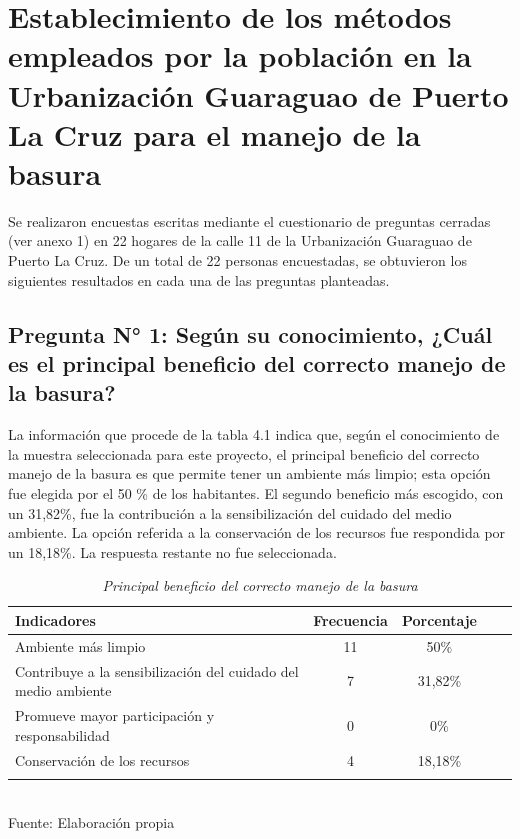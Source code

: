 \newpage

{\setlength{\parskip}{0cm}
\section{Establecimiento de los métodos empleados por la población en la Urbanización Guaraguao de Puerto La Cruz para el manejo de la basura}

Se realizaron encuestas escritas mediante el cuestionario de preguntas cerradas (ver anexo 1) en 22 hogares de la calle 11 de la Urbanización Guaraguao de Puerto La Cruz. De un total de 22 personas encuestadas, se obtuvieron los siguientes resultados en cada una de las preguntas planteadas.
}

{\setlength{\parskip}{0cm}
\subsection{Pregunta N° 1: Según su conocimiento, ¿Cuál es el principal beneficio del correcto manejo de la basura?}

La información que procede de la tabla 4.1 indica que, según el conocimiento de la muestra seleccionada para este proyecto, el principal beneficio del correcto manejo de la basura es que permite tener un ambiente más limpio; esta opción fue elegida por el 50 \% de los habitantes. El segundo beneficio más escogido, con un 31,82\%, fue la contribución a la sensibilización del cuidado del medio ambiente. La opción referida a la conservación de los recursos fue respondida por un 18,18\%. La respuesta restante no fue seleccionada.
}

\begin{table}[h!]
    \centering
    \captionsetup{singlelinecheck=false, justification=raggedright, labelsep=newline}
    \caption{\textit{Principal beneficio del correcto manejo de la basura}}
    \begin{tabular}{lcccc}
        \toprule
        Indicadores & Frecuencia & Porcentaje\\
        \midrule
        Ambiente más limpio & 11 & 50\% \\
        Contribuye a la sensibilización del cuidado del medio ambiente & 7 & 31,82\%\\
        Promueve mayor participación y responsabilidad & 0 & 0\% \\
        Conservación de los recursos & 4 & 18,18\% \\ 
        \bottomrule\\
    \end{tabular}
    \\\RaggedRight Fuente: Elaboración propia
    \label{table:cuadro1}
\end{table}

